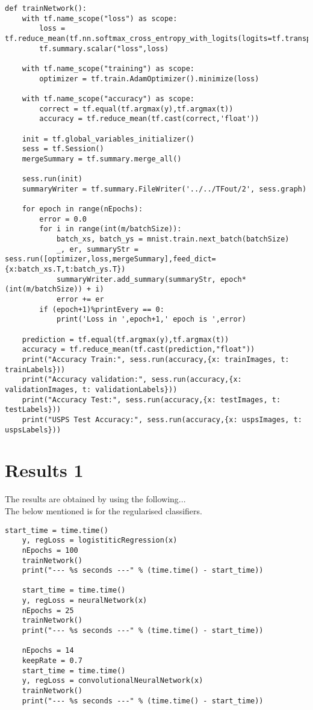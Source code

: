 \documentclass[a4paper,11pt]{article}
\begin{document}
\begin{lstlisting}[label={list:fourth}]
def trainNetwork():
	with tf.name_scope("loss") as scope:
		loss = tf.reduce_mean(tf.nn.softmax_cross_entropy_with_logits(logits=tf.transpose(y),labels=tf.transpose(t)))
		tf.summary.scalar("loss",loss)
	
	with tf.name_scope("training") as scope:
		optimizer = tf.train.AdamOptimizer().minimize(loss)
	
	with tf.name_scope("accuracy") as scope:
		correct = tf.equal(tf.argmax(y),tf.argmax(t))
		accuracy = tf.reduce_mean(tf.cast(correct,'float'))
	
	init = tf.global_variables_initializer()
	sess = tf.Session()
	mergeSummary = tf.summary.merge_all()
	
	sess.run(init)
	summaryWriter = tf.summary.FileWriter('../../TFout/2', sess.graph)
	
	for epoch in range(nEpochs):
		error = 0.0
		for i in range(int(m/batchSize)):
			batch_xs, batch_ys = mnist.train.next_batch(batchSize)
			_, er, summaryStr = sess.run([optimizer,loss,mergeSummary],feed_dict={x:batch_xs.T,t:batch_ys.T})
			summaryWriter.add_summary(summaryStr, epoch*(int(m/batchSize)) + i)
			error += er
		if (epoch+1)%printEvery == 0:
			print('Loss in ',epoch+1,' epoch is ',error)
	
	prediction = tf.equal(tf.argmax(y),tf.argmax(t))
	accuracy = tf.reduce_mean(tf.cast(prediction,"float"))
	print("Accuracy Train:", sess.run(accuracy,{x: trainImages, t: trainLabels}))
	print("Accuracy validation:", sess.run(accuracy,{x: validationImages, t: validationLabels}))
	print("Accuracy Test:", sess.run(accuracy,{x: testImages, t: testLabels}))
	print("USPS Test Accuracy:", sess.run(accuracy,{x: uspsImages, t: uspsLabels}))
\end{lstlisting}

\section*{Results 1}

The results are obtained by using the following...\\
The below mentioned is for the regularised classifiers.
\begin{lstlisting}[label={list:fourth}]
	start_time = time.time()
	y, regLoss = logistiticRegression(x)
	nEpochs = 100
	trainNetwork()
	print("--- %s seconds ---" % (time.time() - start_time))
	
	start_time = time.time()
	y, regLoss = neuralNetwork(x)
	nEpochs = 25
	trainNetwork()
	print("--- %s seconds ---" % (time.time() - start_time))
	
	nEpochs = 14
	keepRate = 0.7
	start_time = time.time()
	y, regLoss = convolutionalNeuralNetwork(x)
	trainNetwork()
	print("--- %s seconds ---" % (time.time() - start_time))
\end{lstlisting}
\end{document}
